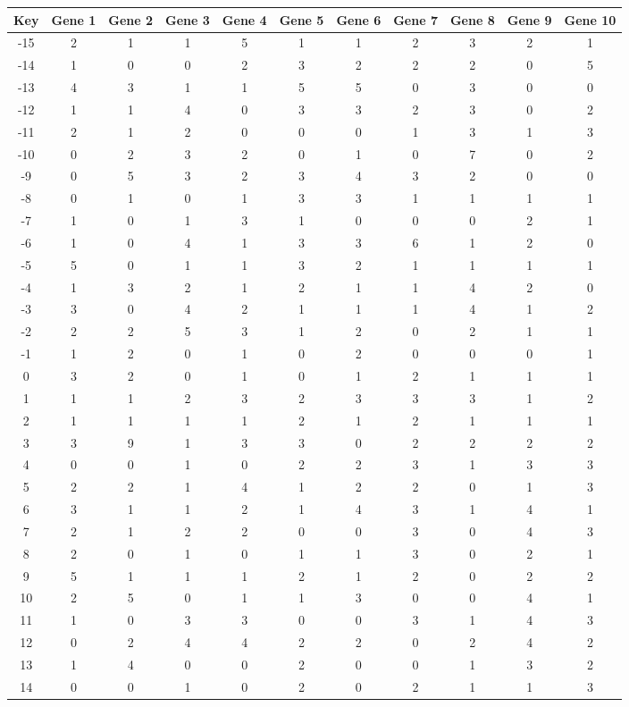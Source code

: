 \begin{tabular}{|c|c|c|c|c|c|c|c|c|c|c|}
\hline
Key & Gene 1 & Gene 2 & Gene 3 & Gene 4 & Gene 5 & Gene 6 & Gene 7 & Gene 8 & Gene 9 & Gene 10 \\
\hline
-15 & 2 & 1 & 1 & 5 & 1 & 1 & 2 & 3 & 2 & 1 \\
-14 & 1 & 0 & 0 & 2 & 3 & 2 & 2 & 2 & 0 & 5 \\
-13 & 4 & 3 & 1 & 1 & 5 & 5 & 0 & 3 & 0 & 0 \\
-12 & 1 & 1 & 4 & 0 & 3 & 3 & 2 & 3 & 0 & 2 \\
-11 & 2 & 1 & 2 & 0 & 0 & 0 & 1 & 3 & 1 & 3 \\
-10 & 0 & 2 & 3 & 2 & 0 & 1 & 0 & 7 & 0 & 2 \\
-9 & 0 & 5 & 3 & 2 & 3 & 4 & 3 & 2 & 0 & 0 \\
-8 & 0 & 1 & 0 & 1 & 3 & 3 & 1 & 1 & 1 & 1 \\
-7 & 1 & 0 & 1 & 3 & 1 & 0 & 0 & 0 & 2 & 1 \\
-6 & 1 & 0 & 4 & 1 & 3 & 3 & 6 & 1 & 2 & 0 \\
-5 & 5 & 0 & 1 & 1 & 3 & 2 & 1 & 1 & 1 & 1 \\
-4 & 1 & 3 & 2 & 1 & 2 & 1 & 1 & 4 & 2 & 0 \\
-3 & 3 & 0 & 4 & 2 & 1 & 1 & 1 & 4 & 1 & 2 \\
-2 & 2 & 2 & 5 & 3 & 1 & 2 & 0 & 2 & 1 & 1 \\
-1 & 1 & 2 & 0 & 1 & 0 & 2 & 0 & 0 & 0 & 1 \\
0 & 3 & 2 & 0 & 1 & 0 & 1 & 2 & 1 & 1 & 1 \\
1 & 1 & 1 & 2 & 3 & 2 & 3 & 3 & 3 & 1 & 2 \\
2 & 1 & 1 & 1 & 1 & 2 & 1 & 2 & 1 & 1 & 1 \\
3 & 3 & 9 & 1 & 3 & 3 & 0 & 2 & 2 & 2 & 2 \\
4 & 0 & 0 & 1 & 0 & 2 & 2 & 3 & 1 & 3 & 3 \\
5 & 2 & 2 & 1 & 4 & 1 & 2 & 2 & 0 & 1 & 3 \\
6 & 3 & 1 & 1 & 2 & 1 & 4 & 3 & 1 & 4 & 1 \\
7 & 2 & 1 & 2 & 2 & 0 & 0 & 3 & 0 & 4 & 3 \\
8 & 2 & 0 & 1 & 0 & 1 & 1 & 3 & 0 & 2 & 1 \\
9 & 5 & 1 & 1 & 1 & 2 & 1 & 2 & 0 & 2 & 2 \\
10 & 2 & 5 & 0 & 1 & 1 & 3 & 0 & 0 & 4 & 1 \\
11 & 1 & 0 & 3 & 3 & 0 & 0 & 3 & 1 & 4 & 3 \\
12 & 0 & 2 & 4 & 4 & 2 & 2 & 0 & 2 & 4 & 2 \\
13 & 1 & 4 & 0 & 0 & 2 & 0 & 0 & 1 & 3 & 2 \\
14 & 0 & 0 & 1 & 0 & 2 & 0 & 2 & 1 & 1 & 3 \\
\hline
\end{tabular}